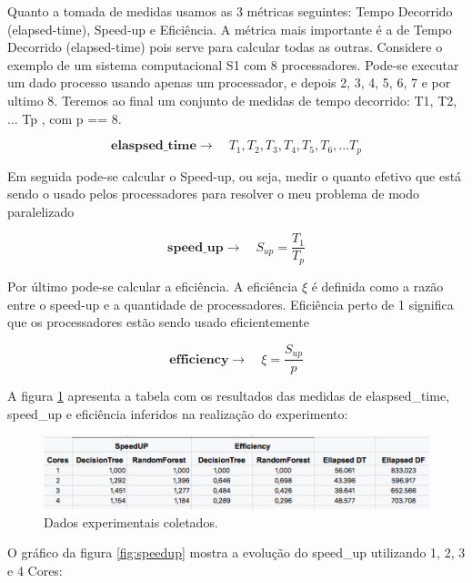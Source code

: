 \documentclass[12pt]{article}
\begin{document}
Quanto a tomada de medidas usamos as 3 métricas seguintes: Tempo Decorrido (elapsed-time), Speed-up e Eficiência. A métrica mais importante é a de Tempo Decorrido (elapsed-time) pois serve para calcular todas as outras. Considere o  exemplo de um sistema computacional S1 com 8 processadores. Pode-se executar um dado processo usando apenas um processador, e depois 2, 3, 4, 5, 6, 7 e por ultimo 8. Teremos ao final um conjunto de medidas de tempo decorrido: T1, T2, ... Tp , com p == 8.


\[
    \textbf{elaspsed\_time} \rightarrow\quad T_1, T_2, T_3, T_4, T_5, T_6, ... T_p
\]

Em seguida pode-se calcular o Speed-up, ou seja, medir o quanto efetivo que está sendo o usado pelos processadores para resolver o meu problema de modo paralelizado

\[
    \textbf{speed\_up} \rightarrow\quad S_{up} = \frac{T_1}{T_p}
\]

Por último pode-se calcular a eficiência. A eficiência $\xi$ é definida como a razão entre o speed-up e a quantidade de processadores. Eficiência perto de 1 significa que os processadores estão sendo usado eficientemente

\[
    \textbf{efficiency} \rightarrow\quad \xi = \frac{S_{up}}{p}
\]

A figura \ref{fig:experimentdata} apresenta a tabela com os resultados das medidas de elaspsed\_time, speed\_up e eficiência inferidos na realização do experimento:


\begin{figure}[!ht]
	\centering\includegraphics[width=\linewidth]{img/experiment-data.png}
	\caption{Dados experimentais coletados.}
	\label{fig:experimentdata}
\end{figure}

O gráfico da figura \ref{fig:speedup} mostra a evolução do speed\_up utilizando 1, 2, 3 e 4 Cores:
\end{document}
